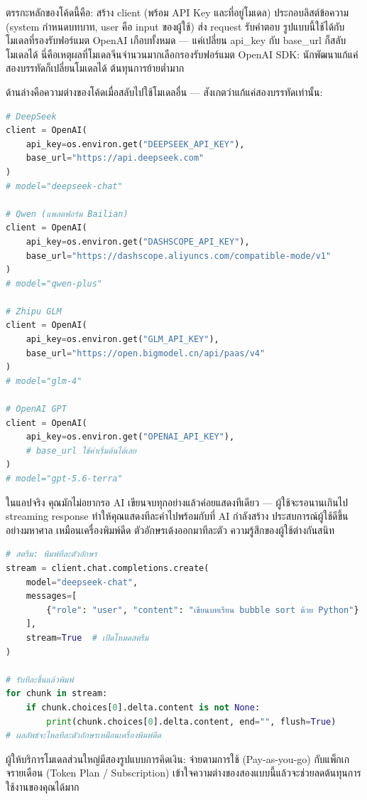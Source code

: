 ตรรกะหลักของโค้ดนี้คือ: สร้าง client (พร้อม API Key และที่อยู่โมเดล) ประกอบลิสต์ข้อความ (system กำหนดบทบาท, user คือ input ของผู้ใช้) ส่ง request รับคำตอบ รูปแบบนี้ใช้ได้กับโมเดลที่รองรับฟอร์แมต OpenAI เกือบทั้งหมด — แค่เปลี่ยน api\_key กับ base\_url ก็สลับโมเดลได้ นี่คือเหตุผลที่โมเดลจีนจำนวนมากเลือกรองรับฟอร์แมต OpenAI SDK: นักพัฒนาแก้แค่สองบรรทัดก็เปลี่ยนโมเดลได้ ต้นทุนการย้ายต่ำมาก

ด้านล่างคือความต่างของโค้ดเมื่อสลับไปใช้โมเดลอื่น — สังเกตว่าแก้แค่สองบรรทัดเท่านั้น:

\begin{lstlisting}[language=Python]
# DeepSeek
client = OpenAI(
    api_key=os.environ.get("DEEPSEEK_API_KEY"),
    base_url="https://api.deepseek.com"
)
# model="deepseek-chat"

# Qwen (แพลตฟอร์ม Bailian)
client = OpenAI(
    api_key=os.environ.get("DASHSCOPE_API_KEY"),
    base_url="https://dashscope.aliyuncs.com/compatible-mode/v1"
)
# model="qwen-plus"

# Zhipu GLM
client = OpenAI(
    api_key=os.environ.get("GLM_API_KEY"),
    base_url="https://open.bigmodel.cn/api/paas/v4"
)
# model="glm-4"

# OpenAI GPT
client = OpenAI(
    api_key=os.environ.get("OPENAI_API_KEY"),
    # base_url ใช้ค่าเริ่มต้นได้เลย
)
# model="gpt-5.6-terra"
\end{lstlisting}


ในแอปจริง คุณมักไม่อยากรอ AI เขียนจบทุกอย่างแล้วค่อยแสดงทีเดียว — ผู้ใช้จะรอนานเกินไป streaming response ทำให้คุณแสดงทีละคำไปพร้อมกับที่ AI กำลังสร้าง ประสบการณ์ผู้ใช้ดีขึ้นอย่างมหาศาล เหมือนเครื่องพิมพ์ดีด ตัวอักษรเด้งออกมาทีละตัว ความรู้สึกของผู้ใช้ต่างกันสนิท

\begin{lstlisting}[language=Python]
# สตรีม: พิมพ์ทีละตัวอักษร
stream = client.chat.completions.create(
    model="deepseek-chat",
    messages=[
        {"role": "user", "content": "เขียนบทเรียน bubble sort ด้วย Python"}
    ],
    stream=True  # เปิดโหมดสตรีม
)

# รับทีละชิ้นแล้วพิมพ์
for chunk in stream:
    if chunk.choices[0].delta.content is not None:
        print(chunk.choices[0].delta.content, end="", flush=True)
# ผลลัพธ์จะไหลทีละตัวอักษรเหมือนเครื่องพิมพ์ดีด
\end{lstlisting}


ผู้ให้บริการโมเดลส่วนใหญ่มีสองรูปแบบการคิดเงิน: จ่ายตามการใช้ (Pay-as-you-go) กับแพ็กเกจรายเดือน (Token Plan / Subscription) เข้าใจความต่างของสองแบบนี้แล้วจะช่วยลดต้นทุนการใช้งานของคุณได้มาก

